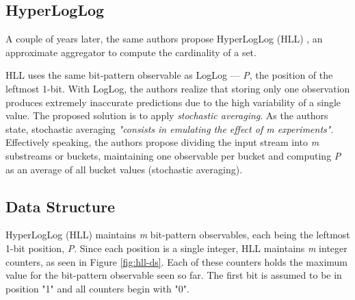 \subsection*{HyperLogLog}
A couple of years later, the same authors propose HyperLogLog (HLL) \cite{Flajolet-HLL}, an approximate aggregator to compute the cardinality of a set. 

HLL uses the same bit-pattern observable as LogLog --- \textit{P}, the position of the leftmost 1-bit. With LogLog, the authors realize that storing only one observation produces extremely inaccurate predictions due to the high variability of a single value. The proposed solution is to apply \textit{stochastic averaging}. As the authors state, stochastic averaging \textit{"consists in emulating the effect of m experiments"}. Effectively speaking, the authors propose dividing the input stream into \textit{m} substreams or buckets, maintaining one observable per bucket and computing \textit{P} as an average of all bucket values (stochastic averaging).

\subsection*{Data Structure}
HyperLogLog (HLL) maintains \textit{m} bit-pattern observables, each being the leftmost 1-bit position, \textit{P}. Since each position is a single integer, HLL maintains \textit{m} integer counters, as seen in Figure \ref{fig:hll-ds}. Each of these counters holds the maximum value for the bit-pattern observable seen so far. The first bit is assumed to be in position "1" and all counters begin with "0".

